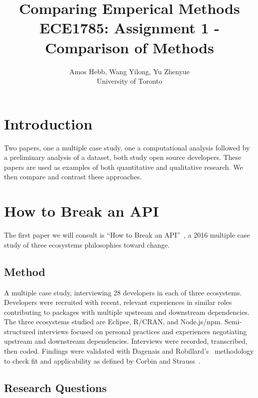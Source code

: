 \documentclass[conference]{IEEEtran}
\begin{document}
\title{Comparing Emperical Methods\\
{\normalsize ECE1785: Assignment 1 - Comparison of Methods}}

\author{Amos Hebb, Wang Yilong, Yu Zhenyue\\ \small University of Toronto}

\maketitle

\section{Introduction}

Two papers, one a multiple case study, one a computational analysis followed by a preliminary analysis of a dataset, both study open source developers.
These papers are used as examples of both quantitative and qualitative research.
We then compare and contrast these approaches.

\section{How to Break an API}

The first paper we will consult is ``How to Break an API''~\cite{bogart2016break}, a 2016 multiple case study of three ecosystems philosophies toward change.

\subsection{Method}

A multiple case study, interviewing 28 developers in each of three ecosystems. Developers were recruited with recent, relevant experiences in similar roles contributing to packages with multiple upstream and downstream dependencies.
The three ecosystems studied are Eclipse, R/CRAN, and Node.js/npm.
Semi-structured interviews focused on personal practices and experiences negotiating upstream and downstream dependencies.
Interviews were recorded, transcribed, then coded.
Findings were validated with Dagenais and Robillard's~\cite{dagenais2010creating} methodology to check fit and applicability as defined by Corbin and Strauss~\cite{corbin2014basics}.

\subsection{Research Questions}
\end{document}

